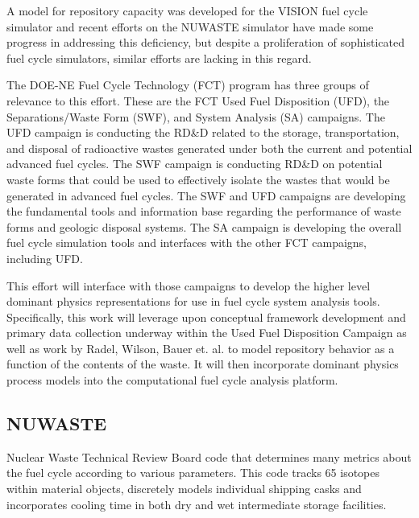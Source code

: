 A model for repository capacity was developed for the VISION fuel cycle
simulator \cite{yacout_visionverifiable_2006} \cite{radel_repository_2007} and
recent efforts on the NUWASTE simulator \cite{ abkowitz_nuclear_2010} have made
some progress in addressing this deficiency, but despite a proliferation of
sophisticated fuel cycle simulators, similar efforts are lacking in this
regard. 


The DOE-NE Fuel Cycle Technology (FCT) program has three groups of relevance to this effort.  These are the FCT Used Fuel Disposition (UFD), the Separations/Waste Form (SWF), and System Analysis (SA) campaigns.  The UFD campaign is conducting the RD\&D related to the storage, transportation, and disposal of radioactive wastes generated under both the current and potential advanced fuel cycles.  The SWF campaign is conducting RD\&D on potential waste forms that could be used to effectively isolate the wastes that would be generated in advanced fuel cycles.  The SWF and UFD campaigns are developing the fundamental tools and information base regarding the performance of waste forms and geologic disposal systems.  The SA campaign is developing the overall fuel cycle simulation tools and interfaces with the other FCT campaigns, including UFD.  

This effort will interface with those campaigns to develop the higher level
dominant physics representations for use in fuel cycle system analysis tools.
Specifically, this work will leverage upon conceptual framework development and
primary data collection underway within the Used Fuel Disposition Campaign as
well as work by Radel, Wilson, Bauer et. al. to model repository behavior as a
function of the contents of the waste.  It will then incorporate dominant
physics process models into the \Cyclus computational fuel cycle analysis
platform.



\clearpage

\subsection{NUWASTE} Nuclear Waste Technical Review Board code that determines
many metrics about the fuel cycle according to various parameters.
\cite{abkowitz_nuclear_2010} This code tracks 65 isotopes within material
objects, discretely models individual shipping casks and incorporates cooling
time in both dry and wet intermediate storage facilities.

